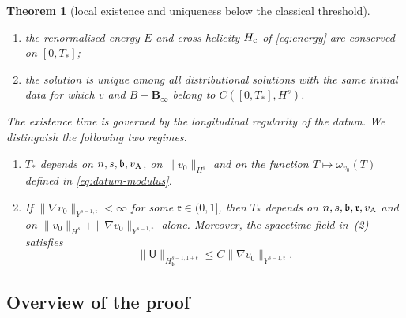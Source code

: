 \documentclass[11pt,reqno]{amsart}
\theoremstyle{plain}
\newtheorem{theorem}{Theorem}[section]
\theoremstyle{definition}
\theoremstyle{remark}
\numberwithin{equation}{section}
\newcommand{\breg}{\mathfrak b}
\newcommand{\rpar}{\mathfrak r}
\newcommand{\Ufield}{\mathsf U}
\newcommand{\Binf}{\mathbf B_\infty}
\begin{document}
\begin{theorem}[local existence and uniqueness below the classical threshold]
\begin{enumerate}
$\|dw\|_{L^\infty_{t,y}}\le\frac12$;
\item the renormalised energy $E$ and cross helicity $H_{\rm c}$ of \eqref{eq:energy} are
conserved on $[0,T_*]$;
\item the solution is unique among all distributional solutions with the same
initial data for which $v$ and $B-\Binf$ belong to
$C([0,T_*],H^s)$. 
\end{enumerate}
The existence time is governed by the longitudinal regularity of the datum. We
distinguish the following two regimes.
\begin{enumerate}
\item[\textbf{\emph{(R1)}}]  $T_*$ depends on $n,s,\breg,
v_{\rm A}$, on $\|v_0\|_{H^{s}}$ and on the function
$T\mapsto\omega_{v_0}(T)$ defined in \eqref{eq:datum-modulus}.
\item[\textbf{\emph{(R2)}}] If $\|\nabla v_0\|_{Y^{s-1,\rpar}}<\infty$
for some $\rpar\in(0,1]$, then $T_*$ depends on $n,s,\breg,\rpar,v_{\rm A}$
and on $\|v_0\|_{H^{s}}+\|\nabla v_0\|_{Y^{s-1,\rpar}}$ alone. Moreover,
the spacetime field in~(2) satisfies
\[
 \|\Ufield\|_{H^{s-1,1+\rpar}_{\breg}}
 \le C\|\nabla v_0\|_{Y^{s-1,\rpar}}.
\]
\end{enumerate}
\end{theorem}

\subsection{Overview of the proof}\label{ssec:overview}
\end{document}
